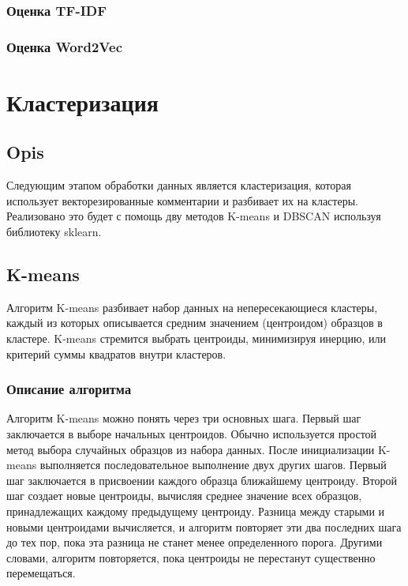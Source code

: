 		\subsubsection{Оценка TF-IDF}
			
		
		\subsubsection{Оценка Word2Vec}

		
	
\section{Кластеризация}

	\subsection{Opis}
		Следующим этапом обработки данных является кластеризация, которая использует векторезированные комментарии и разбивает их на кластеры. Реализовано это будет с помощь дву методов K-means и DBSCAN используя библиотеку sklearn.
	
	\subsection{K-means}
 		Алгоритм K-means  разбивает набор данных на непересекающиеся кластеры, каждый из которых описывается средним значением (центроидом) образцов в кластере. K-means стремится выбрать центроиды, минимизируя инерцию, или критерий суммы квадратов внутри кластеров.
	
		\subsubsection{Описание алгоритма}
			Алгоритм K-means можно понять через три основных шага. Первый шаг заключается в выборе начальных центроидов. Обычно используется простой метод выбора случайных образцов из набора данных. После инициализации K-means выполняется последовательное выполнение двух других шагов. Первый шаг заключается в присвоении каждого образца ближайшему центроиду. Второй шаг создает новые центроиды, вычисляя среднее значение всех образцов, принадлежащих каждому предыдущему центроиду. Разница между старыми и новыми центроидами вычисляется, и алгоритм повторяет эти два последних шага до тех пор, пока эта разница не станет менее определенного порога. Другими словами, алгоритм повторяется, пока центроиды не перестанут существенно перемещаться.

